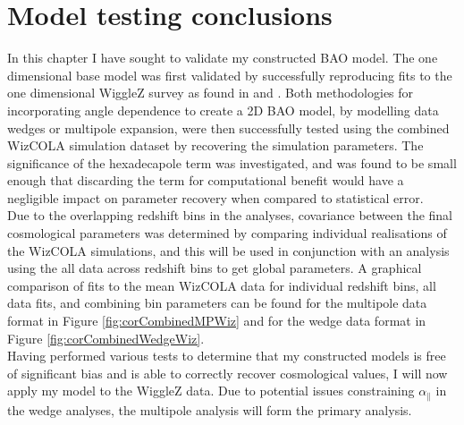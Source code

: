 \documentclass[titlesmallcaps, examinerscopy, copyrightpage]{uqthesis}
\begin{document}
\clearpage
\section{Model testing conclusions}

In this chapter I have sought to validate my constructed BAO model. The one dimensional base model was first validated by successfully reproducing fits to the one dimensional WiggleZ survey as found in \citet{BlakeDavis2011} and \citet{BlakeKazin2011}. Both methodologies for incorporating angle dependence to create a 2D BAO model, by modelling data wedges or multipole expansion, were then successfully tested using the combined WizCOLA simulation dataset by recovering the simulation parameters. The significance of the hexadecapole term was investigated, and was found to be small enough that discarding the term for computational benefit would have a negligible impact on parameter recovery when compared to statistical error.\\

Due to the overlapping redshift bins in the analyses, covariance between the final cosmological parameters was determined by comparing individual realisations of the WizCOLA simulations, and this will be used in conjunction with an analysis using the all data across redshift bins to get global parameters. A graphical comparison of fits to the mean WizCOLA data for individual redshift bins, all data fits, and combining bin parameters can be found for the multipole data format in Figure \ref{fig:corCombinedMPWiz} and for the wedge data format in Figure \ref{fig:corCombinedWedgeWiz}. \\


Having performed various tests to determine that my constructed models is free of significant bias and is able to correctly recover cosmological values, I will now apply my model to the WiggleZ data. Due to potential issues constraining $\alpha_\parallel$ in the wedge analyses, the multipole analysis will form the primary analysis.
\end{document}

